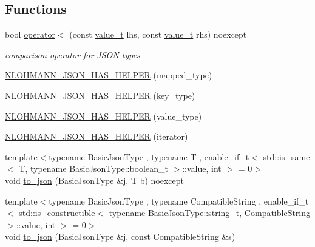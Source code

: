 \subsection*{Functions}
\begin{DoxyCompactItemize}
\item 
bool \mbox{\hyperlink{namespacenlohmann_1_1detail_a09169efff3bd1771fff29bd92cea19e0}{operator$<$}} (const \mbox{\hyperlink{namespacenlohmann_1_1detail_a90aa5ef615aa8305e9ea20d8a947980f}{value\+\_\+t}} lhs, const \mbox{\hyperlink{namespacenlohmann_1_1detail_a90aa5ef615aa8305e9ea20d8a947980f}{value\+\_\+t}} rhs) noexcept
\begin{DoxyCompactList}\small\item\em comparison operator for J\+S\+ON types \end{DoxyCompactList}\item 
\mbox{\hyperlink{namespacenlohmann_1_1detail_a7b2601c238073c43a07862768b319cf8}{N\+L\+O\+H\+M\+A\+N\+N\+\_\+\+J\+S\+O\+N\+\_\+\+H\+A\+S\+\_\+\+H\+E\+L\+P\+ER}} (mapped\+\_\+type)
\item 
\mbox{\hyperlink{namespacenlohmann_1_1detail_ad19328f0c4ffe2890ecafb7c89e0355b}{N\+L\+O\+H\+M\+A\+N\+N\+\_\+\+J\+S\+O\+N\+\_\+\+H\+A\+S\+\_\+\+H\+E\+L\+P\+ER}} (key\+\_\+type)
\item 
\mbox{\hyperlink{namespacenlohmann_1_1detail_af3e900eb1e0b107c812f7babbb94e69e}{N\+L\+O\+H\+M\+A\+N\+N\+\_\+\+J\+S\+O\+N\+\_\+\+H\+A\+S\+\_\+\+H\+E\+L\+P\+ER}} (value\+\_\+type)
\item 
\mbox{\hyperlink{namespacenlohmann_1_1detail_a6648328c4b1466fdc48f1fcfbff23e2f}{N\+L\+O\+H\+M\+A\+N\+N\+\_\+\+J\+S\+O\+N\+\_\+\+H\+A\+S\+\_\+\+H\+E\+L\+P\+ER}} (iterator)
\item 
{\footnotesize template$<$typename Basic\+Json\+Type , typename T , enable\+\_\+if\+\_\+t$<$ std\+::is\+\_\+same$<$ T, typename Basic\+Json\+Type\+::boolean\+\_\+t $>$\+::value, int $>$  = 0$>$ }\\void \mbox{\hyperlink{namespacenlohmann_1_1detail_a1a804b98cbe89b7e44b698f2ca860490}{to\+\_\+json}} (Basic\+Json\+Type \&j, T b) noexcept
\item 
{\footnotesize template$<$typename Basic\+Json\+Type , typename Compatible\+String , enable\+\_\+if\+\_\+t$<$ std\+::is\+\_\+constructible$<$ typename Basic\+Json\+Type\+::string\+\_\+t, Compatible\+String $>$\+::value, int $>$  = 0$>$ }\\void \mbox{\hyperlink{namespacenlohmann_1_1detail_a7356ed05cdbbb080cee80e1211e1c6c9}{to\+\_\+json}} (Basic\+Json\+Type \&j, const Compatible\+String \&s)

\end{DoxyCompactItemize}
